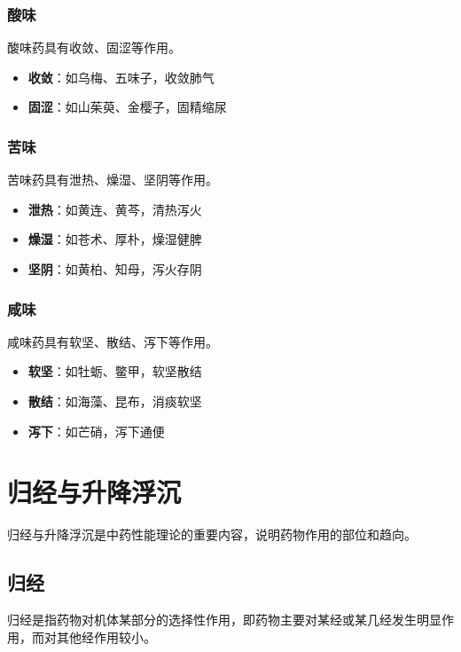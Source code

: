 \documentclass[12pt,UTF8]{ctexbook}
\begin{document}
\subsubsection{酸味}

酸味药具有收敛、固涩等作用。

\begin{itemize}
\item \textbf{收敛}：如乌梅、五味子，收敛肺气
\item \textbf{固涩}：如山茱萸、金樱子，固精缩尿
\end{itemize}

\subsubsection{苦味}

苦味药具有泄热、燥湿、坚阴等作用。

\begin{itemize}
\item \textbf{泄热}：如黄连、黄芩，清热泻火
\item \textbf{燥湿}：如苍术、厚朴，燥湿健脾
\item \textbf{坚阴}：如黄柏、知母，泻火存阴
\end{itemize}

\subsubsection{咸味}

咸味药具有软坚、散结、泻下等作用。

\begin{itemize}
\item \textbf{软坚}：如牡蛎、鳖甲，软坚散结
\item \textbf{散结}：如海藻、昆布，消痰软坚
\item \textbf{泻下}：如芒硝，泻下通便
\end{itemize}

\section{归经与升降浮沉}

归经与升降浮沉是中药性能理论的重要内容，说明药物作用的部位和趋向。

\subsection{归经}

归经是指药物对机体某部分的选择性作用，即药物主要对某经或某几经发生明显作用，而对其他经作用较小。
\end{document}

